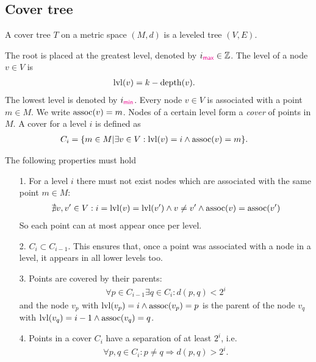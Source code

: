 \subsection{Cover tree}
	\begin{mydef}\label{coverTree}
		A \textnormal{cover tree} $T$ on a metric space $(M, d)$ is a leveled tree $(V, E)$.
		
		The root is placed at the greatest level, denoted by $i_{\textcolor{magenta}{\textsf{max}}} \in \mathbb{Z}$.
		The level of a node $v \in V$ is
		\begin{align*}
			\operatorname{lvl}(v)	&= k - \operatorname{depth}(v).
		\end{align*}
		The lowest level is denoted by $i_{\textcolor{magenta}{\textsf{min}}}$.
		Every node $v \in V$ is associated with a point $m \in M$. We write $\operatorname{assoc}(v) = m$.
		Nodes of a certain level form a \textit{cover} of points in $M$. A cover for a level $i$ is defined as
		\begin{align*}
			C_i	&= \{m \in M | \exists v \in V : \operatorname{lvl}(v) = i \land \operatorname{assoc}(v) = m\}.
		\end{align*}
		
		The following properties must hold
		\begin{itemize}
			\item[1.] For a level $i$ there must not exist nodes which are associated with the same point $m \in M$:
				\begin{align*}
					\nexists v, v' \in V : i = \operatorname{lvl}(v) = \operatorname{lvl}(v') \land v \neq v' \land \operatorname{assoc}(v) = \operatorname{assoc}(v')
				\end{align*}
				So each point can at most appear once per level.
			\item[2.] $C_i \subset C_{i - 1}$. This ensures that, once a point was associated with a node in a
				level, it appears in all lower levels too.
			\item[3.] Points are covered by their parents:
				\begin{align*}
					\forall p \in C_{i - 1} \exists q \in C_{i}: d(p, q) < 2^i
				\end{align*}
				and the node $v_p$ with $\operatorname{lvl}(v_p) = i \land \operatorname{assoc}(v_p) = p$ is the parent of the node
				$v_q$ with $\operatorname{lvl}(v_q) = i - 1 \land \operatorname{assoc}(v_q) = q$.
			\item[4.] Points in a cover $C_i$ have a separation of at least $2^i$, i.e.
				\begin{align*}
					\forall p, q \in C_i : p \neq q \Rightarrow d(p, q) > 2^i.
				\end{align*}
		\end{itemize}
	\end{mydef}
